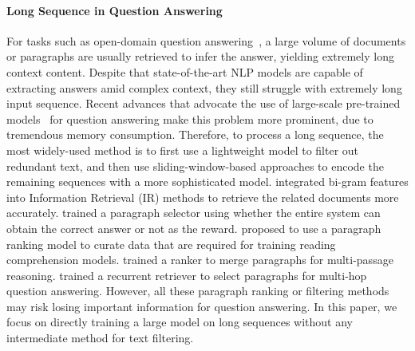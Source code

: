 \documentclass[11pt,a4paper]{article}
\begin{document}
\paragraph{Long Sequence in Question Answering}
For tasks such as open-domain question answering~\cite{chen2017reading}, a large volume of documents or paragraphs are usually retrieved to infer the answer, yielding extremely long context content.
Despite that state-of-the-art NLP models are capable of extracting answers amid complex context,
they still struggle with extremely long input sequence.
Recent advances that advocate the use of large-scale pre-trained models~\citep{bart,roberta,lan2019albert} for question answering
make this problem more prominent, due to tremendous memory consumption.
Therefore, to process a long sequence, the most widely-used method is to first use a lightweight model to filter out redundant text, and then use sliding-window-based approaches to encode the remaining sequences with a more sophisticated model.
\citet{chen2017reading} integrated bi-gram features into Information Retrieval (IR) methods to retrieve the related documents more accurately.
\citet{wang2018r} trained a paragraph selector using whether the entire system can obtain the correct answer or not as the reward.
\citet{lin2018denoising} proposed to use a paragraph ranking model to curate data that are required for training reading comprehension models.
\citet{wang2019multi} trained a ranker to merge paragraphs for multi-passage reasoning.
\citet{asai2019learning} trained a recurrent retriever to select paragraphs for multi-hop question answering.
However, all these paragraph ranking or filtering methods may risk losing important information for question answering.
In this paper, we focus on directly training a large model on long sequences without any intermediate method for text filtering. 
\end{document}
